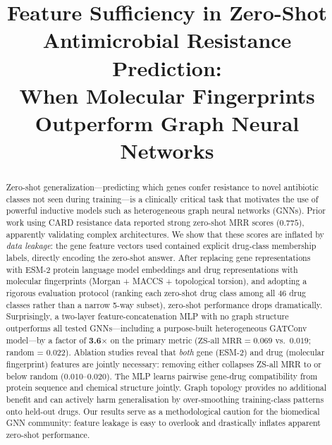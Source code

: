 \documentclass[conference]{IEEEtran}
\begin{document}
\title{Feature Sufficiency in Zero-Shot Antimicrobial Resistance Prediction:\\
When Molecular Fingerprints Outperform Graph Neural Networks}

\author{
}

\maketitle

\begin{abstract}
Zero-shot generalization---predicting which genes confer resistance to novel
antibiotic classes not seen during training---is a clinically critical task that
motivates the use of powerful inductive models such as heterogeneous graph
neural networks (GNNs). Prior work using CARD resistance data reported strong
zero-shot MRR scores ($0.775$), apparently validating complex architectures.
We show that these scores are inflated by \emph{data leakage}: the gene feature
vectors used contained explicit drug-class membership labels, directly encoding
the zero-shot answer. After replacing gene representations with ESM-2 protein
language model embeddings and drug representations with molecular fingerprints
(Morgan + MACCS + topological torsion), and adopting a rigorous evaluation
protocol (ranking each zero-shot drug class among all 46 drug classes rather
than a narrow 5-way subset), zero-shot performance drops dramatically.
Surprisingly, a two-layer feature-concatenation MLP with no graph structure
outperforms all tested GNNs---including a purpose-built heterogeneous GATConv
model---by a factor of \textbf{3.6$\times$} on the primary metric
($\text{ZS-all MRR} = 0.069$ vs.\ $0.019$; random = $0.022$). Ablation
studies reveal that \emph{both} gene (ESM-2) and drug (molecular fingerprint)
features are jointly necessary: removing either collapses ZS-all MRR to or
below random ($0.010$--$0.020$). The MLP learns pairwise gene-drug
compatibility from protein sequence and chemical structure jointly. Graph
topology provides no additional benefit and can actively harm
generalisation by over-smoothing training-class patterns onto held-out drugs. Our results serve as a methodological caution for the biomedical
GNN community: feature leakage is easy to overlook and drastically inflates
apparent zero-shot performance.
\end{abstract}
\end{document}

